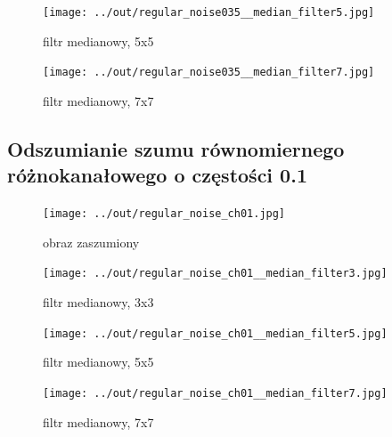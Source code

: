 \documentclass[a4paper,12pt]{article}
\begin{document}
\begin{figure}[h!]
\begin{minipage}[t]{7.5cm}
\begin{center}
\texttt{[image: ../out/regular\_noise035\_\_median\_filter5.jpg]}
\caption{filtr medianowy, 5x5}
\end{center}
\end{minipage}
\hfill
\begin{minipage}[t]{7.5cm}
\begin{center}
\texttt{[image: ../out/regular\_noise035\_\_median\_filter7.jpg]}
\caption{filtr medianowy, 7x7}
\end{center}
\end{minipage}
\end{figure}


\newpage
\subsection{Odszumianie szumu równomiernego różnokanałowego o częstości 0.1}
\begin{figure}[h!]
\begin{minipage}[t]{7.5cm}
\begin{center}
\texttt{[image: ../out/regular\_noise\_ch01.jpg]}
\caption{obraz zaszumiony}
\end{center}
\end{minipage}
\hfill
\begin{minipage}[t]{7.5cm}
\begin{center}
\texttt{[image: ../out/regular\_noise\_ch01\_\_median\_filter3.jpg]}
\caption{filtr medianowy, 3x3}
\end{center}
\end{minipage}
\end{figure}

\begin{figure}[h!]
\begin{minipage}[t]{7.5cm}
\begin{center}
\texttt{[image: ../out/regular\_noise\_ch01\_\_median\_filter5.jpg]}
\caption{filtr medianowy, 5x5}
\end{center}
\end{minipage}
\hfill
\begin{minipage}[t]{7.5cm}
\begin{center}
\texttt{[image: ../out/regular\_noise\_ch01\_\_median\_filter7.jpg]}
\caption{filtr medianowy, 7x7}
\end{center}
\end{minipage}
\end{figure}
\end{document}
